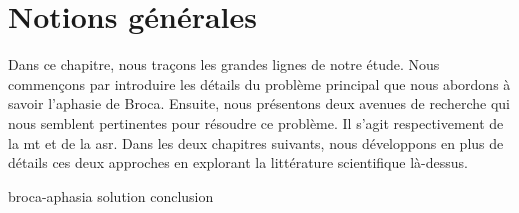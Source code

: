 \chapter{Notions générales}
\label{chap.general-notions}

Dans ce chapitre, nous traçons les grandes lignes de notre étude.
Nous commençons par introduire les détails du problème principal que nous abordons à savoir l'aphasie de Broca.
Ensuite, nous présentons deux avenues de recherche qui nous semblent pertinentes pour résoudre ce problème.
Il s'agit respectivement de la \gls{mt} et de la \gls{asr}.
Dans les deux chapitres suivants, 
nous développons en plus de détails ces deux approches
en explorant la littérature scientifique là-dessus.

{broca-aphasia}
{solution}
{conclusion}